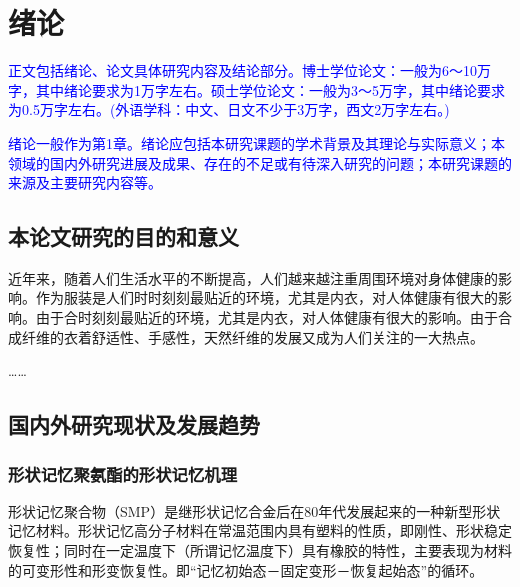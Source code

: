%
%
%
%

\chapter{绪论}

\textcolor{blue}{
  正文包括绪论、论文具体研究内容及结论部分。博士学位论文：一般为6～10万字，其中绪论要求为1万字左右。硕士学位论文：一般为3～5万字，其中绪论要求为0.5万字左右。(外语学科：中文、日文不少于3万字，西文2万字左右。)
}

\textcolor{blue}{
  绪论一般作为第1章。绪论应包括本研究课题的学术背景及其理论与实际意义；本领域的国内外研究进展及成果、存在的不足或有待深入研究的问题；本研究课题的来源及主要研究内容等。
}


\label{chap:intro}
\section{本论文研究的目的和意义}

近年来，随着人们生活水平的不断提高，人们越来越注重周围环境对身体健康的影响。作为服装是人们时时刻刻最贴近的环境，尤其是内衣，对人体健康有很大的影响。由于合时刻刻最贴近的环境，尤其是内衣，对人体健康有很大的影响。由于合成纤维的衣着舒适性、手感性，天然纤维的发展又成为人们关注的一大热点。

……\cite{Takahashi1996Structure,Xia2002Analysis,Jiang1989,Mao2000Motion,Feng1998}

\section{国内外研究现状及发展趋势}

\subsection{形状记忆聚氨酯的形状记忆机理}

形状记忆聚合物（SMP）是继形状记忆合金后在80年代发展起来的一种新型形状记忆材料\cite{Jiang2005Size}。形状记忆高分子材料在常温范围内具有塑料的性质，即刚性、形状稳定恢复性；同时在一定温度下（所谓记忆温度下）具有橡胶的特性，主要表现为材料的可变形性和形变恢复性。即“记忆初始态－固定变形－恢复起始态”的循环。

